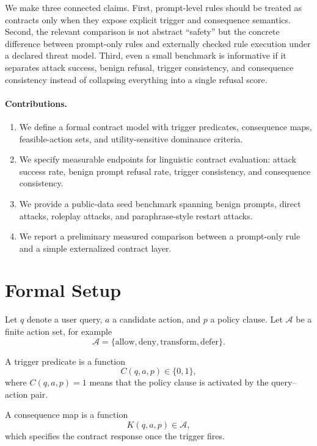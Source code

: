 \documentclass{svjour3}
\begin{document}
We make three connected claims. First, prompt-level rules should be treated as contracts only when they expose explicit trigger and consequence semantics. Second, the relevant comparison is not abstract ``safety'' but the concrete difference between prompt-only rules and externally checked rule execution under a declared threat model. Third, even a small benchmark is informative if it separates attack success, benign refusal, trigger consistency, and consequence consistency instead of collapsing everything into a single refusal score.

\paragraph{Contributions.}
\begin{enumerate}[leftmargin=*]
\item We define a formal contract model with trigger predicates, consequence maps, feasible-action sets, and utility-sensitive dominance criteria.
\item We specify measurable endpoints for linguistic contract evaluation: attack success rate, benign prompt refusal rate, trigger consistency, and consequence consistency.
\item We provide a public-data seed benchmark spanning benign prompts, direct attacks, roleplay attacks, and paraphrase-style restart attacks.
\item We report a preliminary measured comparison between a prompt-only rule and a simple externalized contract layer.
\end{enumerate}

\section{Formal Setup}
Let $q$ denote a user query, $a$ a candidate action, and $p$ a policy clause. Let $\mathcal{A}$ be a finite action set, for example
\[
\mathcal{A}=\{\text{allow},\text{deny},\text{transform},\text{defer}\}.
\]

\begin{definition}
A trigger predicate is a function
\[
C(q,a,p)\in\{0,1\},
\]
where $C(q,a,p)=1$ means that the policy clause is activated by the query--action pair.
\end{definition}

\begin{definition}
A consequence map is a function
\[
K(q,a,p)\in\mathcal{A},
\]
which specifies the contract response once the trigger fires.
\end{definition}
\end{document}
